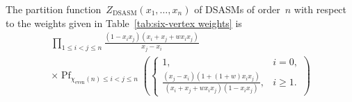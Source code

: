 \documentclass[ALCO, Unicode]{cedram}
\DeclareMathOperator{\DSASM}{DSASM}
\DeclareMathOperator*{\pf}{Pf}
\begin{document}
	\begin{thm}
		\label{thm:partition function}
		The partition function~$Z_{\DSASM} (x_1,\dots,x_n)$ of DSASMs of order~$n$ with respect to the weights given in Table~\ref{tab:six-vertex weights} is
		\begin{multline}\label{eq:partition function}
			\prod_{1 \le i < j \le n} \frac{(1-x_i x_j) (x_i+x_j+w x_i x_j)}{x_j -x_i}\\
			\times \pf_{\chi_{\mathrm{even}}(n) \le i < j \le n} \left(
			\begin{cases}
				1, & i=0,\\
				\frac{(x_j-x_i)(1+(1+w) x_i x_j)}{(x_i+x_j+w x_i x_j)(1-x_i x_j)},& i\ge 1.
			\end{cases} \right)
		\end{multline}
	\end{thm}
	
\end{document}
